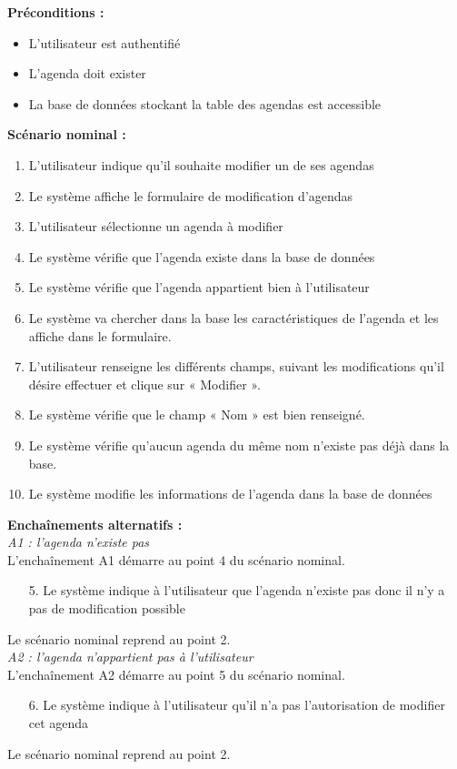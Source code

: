 \documentclass[12pt , a4paper]{article}
\begin{document}
\noindent\textbf{Préconditions :}
\begin{itemize}
\item L’utilisateur est authentifié
\item L'agenda doit exister
\item La base de données stockant la table des agendas est accessible\\
\end{itemize}


\noindent\textbf{Scénario nominal :}
\begin{enumerate}
\item L’utilisateur indique qu'il souhaite modifier un de ses agendas
\item Le système affiche le formulaire de modification d’agendas
\item L’utilisateur sélectionne un agenda à modifier
\item Le système vérifie que l’agenda existe dans la base de données
\item Le système vérifie que l’agenda appartient bien à l’utilisateur
\item Le système va chercher dans la base les caractéristiques de l’agenda et les affiche dans le formulaire.
\item L’utilisateur renseigne les différents champs, suivant les modifications qu’il désire effectuer et clique sur « Modifier ».
\item Le système vérifie que le champ « Nom » est bien renseigné.
\item Le système vérifie qu’aucun agenda du même nom n’existe pas déjà dans la base.
\item Le système modifie les informations de l’agenda dans la base de données\\
\end{enumerate}

\noindent\textbf{Encha\^inements alternatifs :}\\
\noindent\textit{A1 : l’agenda n’existe pas}\\
L'encha\^inement A1 démarre au point 4 du scénario nominal.
\begin{enumerate}
\item[5.] Le système indique à l’utilisateur que l’agenda n’existe pas donc il n’y a pas de modification possible
\end{enumerate}
Le scénario nominal reprend au point 2.\\


\noindent\textit{A2 : l’agenda n’appartient pas à l’utilisateur}\\
L'encha\^inement A2 démarre au point 5 du scénario nominal.
\begin{enumerate}
\item[6.] Le système indique à l’utilisateur qu’il n’a pas l’autorisation de modifier cet agenda
\end{enumerate}
Le scénario nominal reprend au point 2.\\
\end{document}
